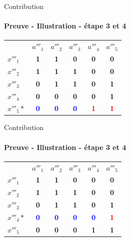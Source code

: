 \documentclass{beamer}
\begin{document}
  \begin{frame}{Contribution}
  \framesubtitle{Preuve - Illustration - étape 3 et 4}
\begin{table}[htb]
  \centering
\begin{tabular}{lccccc}
 & $a'''_1$ & $a'''_2$ & $a'''_3$ & $a'''_4$ & $a'''_5$\\
$x'''_1$ & \textbf{1} & \textbf{1} & \textbf{0} & \textbf{0} & \textbf{0}\\
$x'''_2$ & \textbf{1} & \textbf{1} & \textbf{1} & \textbf{0} & \textbf{0}\\
$x'''_3$ & \textbf{0} & \textbf{1} & \textbf{1} & \textbf{0} & \textbf{1}\\
$x'''_4$ & \textbf{0} & \textbf{0} & \textbf{0} & \textbf{0} & \textbf{1}\\
$x'''_5*$ & \textcolor{blue}{\textbf{0}} & \textcolor{blue}{\textbf{0}} & \textcolor{blue}{\textbf{0}} & \textcolor{red}{\textbf{1}} & \textcolor{red}{\textbf{1}}

\end{tabular}
\end{table}
  \end{frame}

 \begin{frame}{Contribution}
  \framesubtitle{Preuve - Illustration - étape 3 et 4}
\begin{table}[htb]
  \centering
\begin{tabular}{lccccc}
 & $a'''_1$ & $a'''_2$ & $a'''_3$ & $a'''_4$ & $a'''_5$\\
$x'''_1$ & \textbf{1} & \textbf{1} & \textbf{0} & \textbf{0} & \textbf{0}\\
$x'''_2$ & \textbf{1} & \textbf{1} & \textbf{1} & \textbf{0} & \textbf{0}\\
$x'''_3$ & \textbf{0} & \textbf{1} & \textbf{1} & \textbf{0} & \textbf{1}\\
$x'''_4*$ & \textcolor{blue}{\textbf{0}} & \textcolor{blue}{\textbf{0}} & \textcolor{blue}{\textbf{0}} & \textcolor{blue}{\textbf{0}} & \textcolor{red}{\textbf{1}}\\
$x'''_5$ & \textbf{0} & \textbf{0} & \textbf{0} & \textbf{1} & \textbf{1}

\end{tabular}
\end{table}
  \end{frame}
\end{document}
